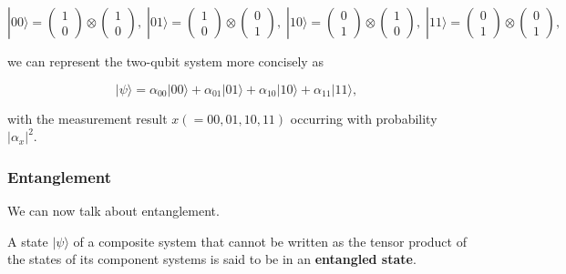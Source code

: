 \documentclass{article}
\begin{document}
\begin{example}
      \[
        |00\rangle = \begin{pmatrix} 1 \\ 0 \end{pmatrix} \otimes \begin{pmatrix} 1 \\ 0 \end{pmatrix}, \; 
        |01\rangle = \begin{pmatrix} 1 \\ 0 \end{pmatrix} \otimes \begin{pmatrix} 0 \\ 1 \end{pmatrix}, \; 
        |10\rangle = \begin{pmatrix} 0 \\ 1 \end{pmatrix} \otimes \begin{pmatrix} 1 \\ 0 \end{pmatrix}, \; 
        |11\rangle = \begin{pmatrix} 0 \\ 1 \end{pmatrix} \otimes \begin{pmatrix} 0 \\ 1 \end{pmatrix}, 
      \]

      we can represent the two-qubit system more concisely as

        \[|\psi \rangle = \alpha_{00} |00\rangle + \alpha_{01} |01\rangle + \alpha_{10} |10\rangle + \alpha_{11} |11\rangle,\]

      with the measurement result $x ( = 00, 01, 10, 11)$ occurring with probability $|\alpha_{x}|^2$.
    \end{example}

    \subsubsection{Entanglement} 

      We can now talk about entanglement. 

      \begin{definition}
        A state $|\psi\rangle$ of a composite system that cannot be written as the tensor product of the states of its component systems is said to be in an \textbf{entangled state}.   
      \end{definition}
\end{document}
